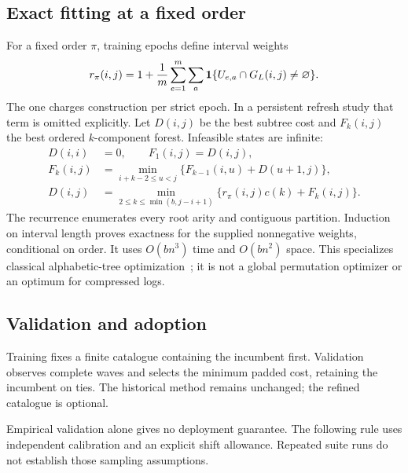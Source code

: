 \documentclass[preprint,12pt]{elsarticle}
\theoremstyle{definition}\newtheorem{definition}[theorem]{Definition}
\begin{document}
\subsection{Exact fitting at a fixed order}
For a fixed order $\pi$, training epochs define interval weights
\begin{equation}\label{eq:jweights}
 r_\pi(i,j)=1+\frac1m\sum_{e=1}^m\sum_a
 \mathbf 1\{U_{e,a}\cap G_L(i,j)\ne\varnothing\}.
\end{equation}
The one charges construction per strict epoch. In a persistent refresh study
that term is omitted explicitly.
Let $D(i,j)$ be the best subtree cost and $F_k(i,j)$ the best ordered
$k$-component forest. Infeasible states are infinite:
\begin{align}
 D(i,i)&=0,\qquad F_1(i,j)=D(i,j),\nonumber\\
 F_k(i,j)&=\min_{i+k-2\le u<j}
       \{F_{k-1}(i,u)+D(u+1,j)\},\nonumber\\
 D(i,j)&=\min_{2\le k\le\min(b,j-i+1)}
       \{r_\pi(i,j)c(k)+F_k(i,j)\}.\label{eq:dp}
\end{align}
The recurrence enumerates every root arity and contiguous partition.
Induction on interval length proves exactness for the supplied nonnegative
weights, conditional on order. It uses $O(bn^3)$ time and $O(bn^2)$ space.
This specializes classical alphabetic-tree optimization~\cite{alphabetic};
it is not a global permutation optimizer or an optimum for compressed logs.



\subsection{Validation and adoption}
Training fixes a finite catalogue containing the incumbent first.
Validation observes complete waves and selects the minimum padded cost,
retaining the incumbent on ties. The historical method remains unchanged;
the refined catalogue is optional.

Empirical validation alone gives no deployment guarantee. The following
rule uses independent calibration and an explicit shift allowance.
Repeated suite runs do not establish those sampling assumptions.


\end{document}
